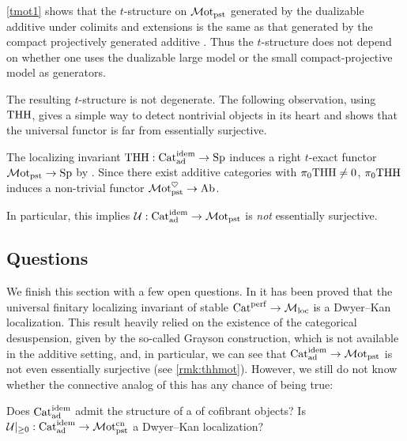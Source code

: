 \documentclass[a4paper,10pt, oneside]{amsart}
\begin{document}
	\begin{rem}
			\cref{tmot1} shows that the $t$-structure on $\mathcal{M}\mathrm{ot}_{\mathrm{pst}}$ generated by the dualizable additive \infcats under colimits and extensions is the same as that generated by the compact projectively generated additive \infcats. Thus the \(t\)-structure does not depend on whether one uses the dualizable
			large model or the small compact-projective model as generators.
	\end{rem}
	The resulting \(t\)-structure is not degenerate.  The following observation,
	using \(\mathrm{THH}\), gives a simple way to detect nontrivial objects in its
	heart and shows that the universal functor is far from essentially
	surjective.
	\begin{rem}\label{rmk:thhmot}
		The localizing invariant $\mathrm{THH}: \mathrm{Cat}_{\mathrm{ad}}^{\mathrm{idem}} \to \mathrm{Sp}$
		induces a right $t$-exact functor $\mathcal{M}\mathrm{ot}_{\mathrm{pst}} \to \mathrm{Sp}$ by \cite[Theorem 1.3.4.11]{ha}.
		Since there exist additive categories with $\pi_0\mathrm{THH} \neq 0$, $\pi_0\mathrm{THH}$ induces a non-trivial 
		functor $\mathcal{M}\mathrm{ot}_{\mathrm{pst}}^\heartsuit \to \mathrm{Ab}$. 
		
		In particular, this implies $\mathcal{U}:\mathrm{Cat}_{\mathrm{ad}}^{\mathrm{idem}}\to \mathcal{M}\mathrm{ot}_{\mathrm{pst}}$ is \emph{not} essentially surjective.
	\end{rem}



\subsection{Questions}
We finish this section with a few open questions. 
In \cite{ramzi2025every} it has been proved that the universal finitary localizing invariant of stable \infcats $\mathrm{Cat}^{\mathrm{perf}} \to \mathcal{M}_{\mathrm{loc}}$ is a Dwyer--Kan localization. 
This result heavily relied on the existence of the categorical desuspension, given by the so-called Grayson construction, which is not available in the additive setting, and, in particular, we can see that 
$\mathrm{Cat}_{\mathrm{ad}}^{\mathrm{idem}}\to \mathcal{M}\mathrm{ot}_{\mathrm{pst}}$ is not even essentially surjective (see \cref{rmk:thhmot}). However, we still do not know whether the connective analog of this has any chance of being true:
\begin{quest} 
	Does $\mathrm{Cat}_{\mathrm{ad}}^{\mathrm{idem}}$ admit the structure of a \infcat of cofibrant objects? 
	Is $\mathcal{U}|_{\geq 0}: \mathrm{Cat}_{\mathrm{ad}}^{\mathrm{idem}}\to \mathcal{M}\mathrm{ot}^{\mathrm{cn}}_{\mathrm{pst}}$ a Dwyer--Kan localization?
\end{quest}
\end{document}
